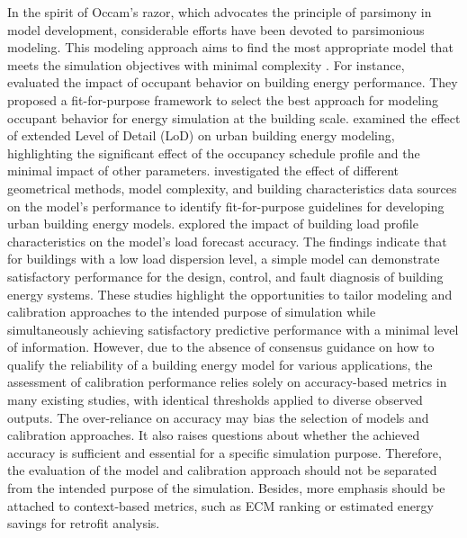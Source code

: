 \documentclass[3p,times,12pt]{elsarticle}
\begin{document}
\begin{sloppypar}
In the spirit of Occam’s razor, which advocates the principle of parsimony in model development, considerable efforts have been devoted to parsimonious modeling. This modeling approach aims to find the most appropriate model that meets the simulation objectives with minimal complexity \cite{tuysuz2020calibrating}. For instance, \citet{gaetani2016occupant} evaluated the impact of occupant behavior on building energy performance. They proposed a fit-for-purpose framework to select the best approach for modeling occupant behavior for energy simulation at the building scale. \citet{mathur2020towards} examined the effect of extended Level of Detail (LoD) on urban building energy modeling, highlighting the significant effect of the occupancy schedule profile and the minimal impact of other parameters. \citet{saad2023investigating} investigated the effect of different geometrical methods, model complexity, and building characteristics data sources on the model's performance to identify fit-for-purpose guidelines for developing urban building energy models. \cite{hu2023impacts} explored the impact of building load profile characteristics on the model's load forecast accuracy. The findings indicate that for buildings with a low load dispersion level, a simple model can demonstrate satisfactory performance for the design, control, and fault diagnosis of building energy systems. These studies highlight the opportunities to tailor modeling and calibration approaches to the intended purpose of simulation while simultaneously achieving satisfactory predictive performance with a minimal level of information. However, due to the absence of consensus guidance on how to qualify the reliability of a building energy model for various applications, the assessment of calibration performance relies solely on accuracy-based metrics in many existing studies, with identical thresholds applied to diverse observed outputs. The over-reliance on accuracy may bias the selection of models and calibration approaches. It also raises questions about whether the achieved accuracy is sufficient and essential for a specific simulation purpose. Therefore, the evaluation of the model and calibration approach should not be separated from the intended purpose of the simulation. Besides, more emphasis should be attached to context-based metrics, such as ECM ranking or estimated energy savings for retrofit analysis. 


\end{sloppypar}
\end{document}
